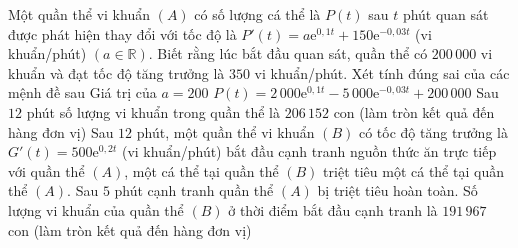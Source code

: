 \begin{ex}%
	Một quần thể vi khuẩn $(A)$ có số lượng cá thể là $P(t)$ sau $t$ phút quan sát được phát hiện thay đổi với tốc độ là $P'(t)=a\mathrm{e}^{0{,}1t}+150\mathrm{e}^{-0{,}03t}$ (vi khuẩn/phút) $(a\in\mathbb{R})$. Biết rằng lúc bắt đầu quan sát, quần thể có $200\,000$ vi khuẩn và đạt tốc độ tăng trưởng là $350$ vi khuẩn/phút. Xét tính đúng sai của các mệnh đề sau
	\choiceTF
	{\True Giá trị của $a=200$}
	{$P(t)=2\,000\mathrm{e}^{0{,}1t}-5\,000\mathrm{e}^{-0{,}03t}+200\,000$}
	{\True Sau $12$ phút số lượng vi khuẩn trong quần thể là $206\,152$ con (làm tròn kết quả đến hàng đơn vị)}
	{Sau $12$ phút, một quần thể vi khuẩn $(B)$ có tốc độ tăng trưởng là $G'(t)=500\mathrm{e}^{0{,}2t}$ (vi khuẩn/phút) bắt đầu cạnh tranh nguồn thức ăn trực tiếp với quần thể $(A)$, một cá thể tại quần thể $(B)$ triệt tiêu một cá thể tại quần thể $(A)$. Sau $5$ phút cạnh tranh quần thể $(A)$ bị triệt tiêu hoàn toàn. Số lượng vi khuẩn của quần thể $(B)$ ở thời điểm bắt đầu cạnh tranh là $191\,967$ con (làm tròn kết quả đến hàng đơn vị)}
\end{ex}
